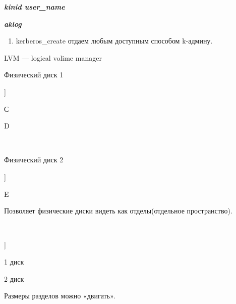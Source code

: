 \par 
\textit{\textbf{kinid user\_name}}
\par 
\textit{\textbf{aklog}}
\begin{enumerate}
	\item \par 
	kerberos\_create отдаем любым доступным
	способом k-админу.
\end{enumerate}
\par 
LVM — logical volime manager
\par 
Физический диск 1
\begin{description}
	]
	
		
		
		
			
				\par С
			
			
				\par D
			
		
	
\end{description}
\par \\

\par 
Физический диск 2
\begin{description}
	]
	
		
		
			
				\par E
			
		
	
\end{description}
\par 
Позволяет физические диски
видеть как отделы(отдельное пространство).
\par 
\\

\begin{description}
	]
	
		
		
		
			
				\par 1 диск
			
			
				\par 2 диск
			
		
	
\end{description}
\par 
Размеры разделов можно «двигать».
\par 
\\


